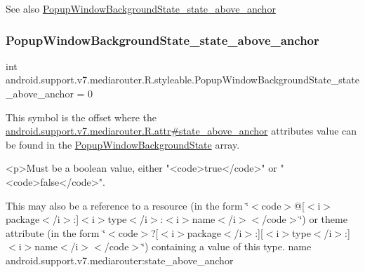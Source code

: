 \begin{DoxySeeAlso}{See also}
\hyperlink{classandroid_1_1support_1_1v7_1_1mediarouter_1_1R_1_1styleable_a66e99f54d31428c26c86bfd6a4191e2f}{Popup\+Window\+Background\+State\+\_\+state\+\_\+above\+\_\+anchor} 
\end{DoxySeeAlso}
\mbox{\label{classandroid_1_1support_1_1v7_1_1mediarouter_1_1R_1_1styleable_a66e99f54d31428c26c86bfd6a4191e2f}} 
\subsubsection{\texorpdfstring{Popup\+Window\+Background\+State\+\_\+state\+\_\+above\+\_\+anchor}{PopupWindowBackgroundState\_state\_above\_anchor}}
{\footnotesize\ttfamily int android.\+support.\+v7.\+mediarouter.\+R.\+styleable.\+Popup\+Window\+Background\+State\+\_\+state\+\_\+above\+\_\+anchor = 0\hspace{0.3cm}{\ttfamily [static]}}

This symbol is the offset where the \hyperlink{classandroid_1_1support_1_1v7_1_1mediarouter_1_1R_1_1attr_af5c16e95162c3cece10441e854e43361}{android.\+support.\+v7.\+mediarouter.\+R.\+attr\#state\+\_\+above\+\_\+anchor} attribute\textquotesingle{}s value can be found in the \hyperlink{classandroid_1_1support_1_1v7_1_1mediarouter_1_1R_1_1styleable_a716145c1da7306108d9ae51de6ea6eed}{Popup\+Window\+Background\+State} array.

\begin{DoxyVerb}      <p>Must be a boolean value, either "<code>true</code>" or "<code>false</code>".
\end{DoxyVerb}
 

This may also be a reference to a resource (in the form \char`\"{}$<$code$>$@\mbox{[}$<$i$>$package$<$/i$>$\+:\mbox{]}$<$i$>$type$<$/i$>$\+:$<$i$>$name$<$/i$>$$<$/code$>$\char`\"{}) or theme attribute (in the form \char`\"{}$<$code$>$?\mbox{[}$<$i$>$package$<$/i$>$\+:\mbox{]}\mbox{[}$<$i$>$type$<$/i$>$\+:\mbox{]}$<$i$>$name$<$/i$>$$<$/code$>$\char`\"{}) containing a value of this type.  name android.\+support.\+v7.\+mediarouter\+:state\+\_\+above\+\_\+anchor \mbox{\label{classandroid_1_1support_1_1v7_1_1mediarouter_1_1R_1_1styleable_af634dfe19333cdc00d399d1f00635e93}} 
